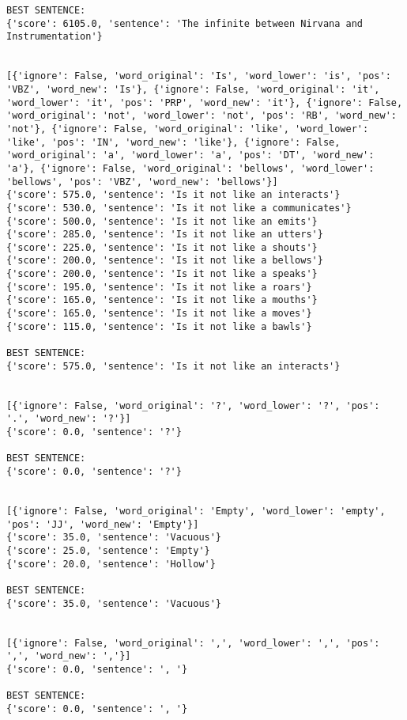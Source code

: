 \documentclass[12pt,a4paper,oneside]{book}
\begin{document}
\begin{verbatim}
BEST SENTENCE:
{'score': 6105.0, 'sentence': 'The infinite between Nirvana and Instrumentation'}


[{'ignore': False, 'word_original': 'Is', 'word_lower': 'is', 'pos': 'VBZ', 'word_new': 'Is'}, {'ignore': False, 'word_original': 'it', 'word_lower': 'it', 'pos': 'PRP', 'word_new': 'it'}, {'ignore': False, 'word_original': 'not', 'word_lower': 'not', 'pos': 'RB', 'word_new': 'not'}, {'ignore': False, 'word_original': 'like', 'word_lower': 'like', 'pos': 'IN', 'word_new': 'like'}, {'ignore': False, 'word_original': 'a', 'word_lower': 'a', 'pos': 'DT', 'word_new': 'a'}, {'ignore': False, 'word_original': 'bellows', 'word_lower': 'bellows', 'pos': 'VBZ', 'word_new': 'bellows'}]
{'score': 575.0, 'sentence': 'Is it not like an interacts'}
{'score': 530.0, 'sentence': 'Is it not like a communicates'}
{'score': 500.0, 'sentence': 'Is it not like an emits'}
{'score': 285.0, 'sentence': 'Is it not like an utters'}
{'score': 225.0, 'sentence': 'Is it not like a shouts'}
{'score': 200.0, 'sentence': 'Is it not like a bellows'}
{'score': 200.0, 'sentence': 'Is it not like a speaks'}
{'score': 195.0, 'sentence': 'Is it not like a roars'}
{'score': 165.0, 'sentence': 'Is it not like a mouths'}
{'score': 165.0, 'sentence': 'Is it not like a moves'}
{'score': 115.0, 'sentence': 'Is it not like a bawls'}

BEST SENTENCE:
{'score': 575.0, 'sentence': 'Is it not like an interacts'}


[{'ignore': False, 'word_original': '?', 'word_lower': '?', 'pos': '.', 'word_new': '?'}]
{'score': 0.0, 'sentence': '?'}

BEST SENTENCE:
{'score': 0.0, 'sentence': '?'}


[{'ignore': False, 'word_original': 'Empty', 'word_lower': 'empty', 'pos': 'JJ', 'word_new': 'Empty'}]
{'score': 35.0, 'sentence': 'Vacuous'}
{'score': 25.0, 'sentence': 'Empty'}
{'score': 20.0, 'sentence': 'Hollow'}

BEST SENTENCE:
{'score': 35.0, 'sentence': 'Vacuous'}


[{'ignore': False, 'word_original': ',', 'word_lower': ',', 'pos': ',', 'word_new': ','}]
{'score': 0.0, 'sentence': ', '}

BEST SENTENCE:
{'score': 0.0, 'sentence': ', '}



\end{verbatim}
\end{document}
